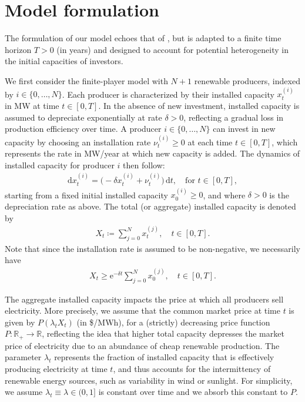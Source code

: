\documentclass[12pt]{article}
\def \R{\mathbb{R}}
\def\erm{\mathrm{e}}
\def\drm{\mathrm{d}}
\begin{document}
\section{Model formulation}\label{sec:model}

The formulation of our model echoes that of \cite{alasseur2023mean}, but is adapted to a finite time horizon \( T > 0 \) (in years) and designed to account for potential heterogeneity in the initial capacities of investors. 

We first consider the finite-player model with \( N+1 \) renewable producers, indexed by \( i \in \{0, \dots, N\} \). Each producer is characterized by their installed capacity \( x^{(i)}_t \) in {MW} at time \( t \in [0, T] \). In the absence of new investment, installed capacity is assumed to depreciate exponentially at rate \( \delta > 0 \), reflecting a gradual loss in production efficiency over time. A producer \( i \in \{0, \dots, N\} \) can invest in new capacity by choosing an installation rate \( \nu^{(i)}_t \geq 0 \) at each time $t \in [0,T]$, which represents the rate in {MW/year} at which new capacity is added. The dynamics of installed capacity for producer \( i \) then follow:
\begin{align}\label{eq:prod_dynamics}
    \drm x^{(i)}_t = \big(-\delta x^{(i)}_t + \nu^{(i)}_t\big)\, \drm t, \quad \text{for } t \in [0, T],
\end{align}
starting from a fixed initial installed capacity \( x^{(i)}_0 \geq 0 \), and where \( \delta > 0 \) is the depreciation rate as above. The total (or aggregate) installed capacity is denoted by
\begin{align}\label{eq:sum_prod}
    X_t \coloneq \sum_{j=0}^{N} x^{(j)}_t, \quad t\in[0,T].
\end{align}
Note that since the installation rate is assumed to be non-negative, we necessarily have
\begin{align}\label{eq:lower_bound}
    X_t \geq \erm^{-\delta t} \sum_{j=0}^{N} x^{(j)}_0, \quad t\in[0,T].
\end{align}

The aggregate installed capacity impacts the price at which all producers sell electricity. More precisely, we assume that the common market price at time $t$ is given by \( P(\lambda_tX_t) \) (in \$/MWh), for a (strictly) decreasing price function \( P: \R_+ \longrightarrow \mathbb{R} \), reflecting the idea that higher total capacity depresses the market price of electricity due to an abundance of cheap renewable production. The parameter $\lambda_t$ represents the fraction of installed capacity that is effectively producing electricity at time $t$, and thus accounts for the intermittency of renewable energy sources, such as variability in wind or sunlight. For simplicity, we assume $\lambda_t\equiv \lambda\in(0,1]$ is constant over time and we absorb this constant to $P$. 
\end{document}
